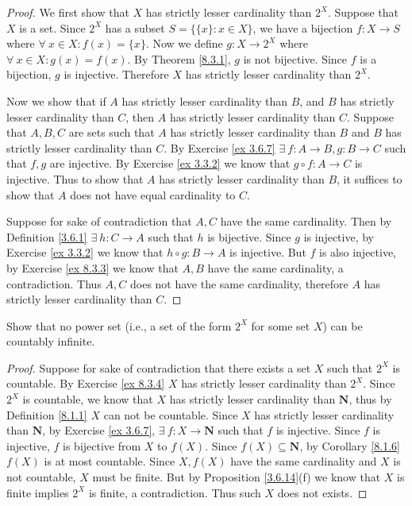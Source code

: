 \begin{proof}
    We first show that \(X\) has strictly lesser cardinality than \(2^X\).
    Suppose that \(X\) is a set.
    Since \(2^X\) has a subset \(S = \{\{x\} : x \in X\}\), we have a bijection \(f : X \to S\) where \(\forall\ x \in X : f(x) = \{x\}\).
    Now we define \(g : X \to 2^X\) where \(\forall\ x \in X : g(x) = f(x)\).
    By Theorem \ref{8.3.1}, \(g\) is not bijective.
    Since \(f\) is a bijection, \(g\) is injective.
    Therefore \(X\) has strictly lesser cardinality than \(2^X\).

    Now we show that if \(A\) has strictly lesser cardinality than \(B\), and \(B\) has strictly lesser cardinality than \(C\), then \(A\) has strictly lesser cardinality than \(C\).
    Suppose that \(A, B, C\) are sets such that \(A\) has strictly lesser cardinality than \(B\) and \(B\) has strictly lesser cardinality than \(C\).
    By Exercise \ref{ex 3.6.7} \(\exists\ f : A \to B, g : B \to C\) such that \(f, g\) are injective.
    By Exercise \ref{ex 3.3.2} we know that \(g \circ f : A \to C\) is injective.
    Thus to show that \(A\) has strictly lesser cardinality than \(B\), it suffices to show that \(A\) does not have equal cardinality to \(C\).

    Suppose for sake of contradiction that \(A, C\) have the same cardinality.
    Then by Definition \ref{3.6.1} \(\exists\ h : C \to A\) such that \(h\) is bijective.
    Since \(g\) is injective, by Exercise \ref{ex 3.3.2} we know that \(h \circ g : B \to A\) is injective.
    But \(f\) is also injective, by Exercise \ref{ex 8.3.3} we know that \(A, B\) have the same cardinality, a contradiction.
    Thus \(A, C\) does not have the same cardinality, therefore \(A\) has strictly lesser cardinality than \(C\).
\end{proof}

\begin{exercise}\label{ex 8.3.5}
    Show that no power set (i.e., a set of the form \(2^X\) for some set \(X\)) can be countably infinite.
\end{exercise}

\begin{proof}
    Suppose for sake of contradiction that there exists a set \(X\) such that \(2^X\) is countable.
    By Exercise \ref{ex 8.3.4} \(X\) has strictly lesser cardinality than \(2^X\).
    Since \(2^X\) is countable, we know that \(X\) has strictly lesser cardinality than \(\mathbf{N}\), thus by Definition \ref{8.1.1} \(X\) can not be countable.
    Since \(X\) has strictly lesser cardinality than \(\mathbf{N}\), by Exercise \ref{ex 3.6.7}, \(\exists\ f : X \to \mathbf{N}\) such that \(f\) is injective.
    Since \(f\) is injective, \(f\) is bijective from \(X\) to \(f(X)\).
    Since \(f(X) \subseteq \mathbf{N}\), by Corollary \ref{8.1.6} \(f(X)\) is at most countable.
    Since \(X, f(X)\) have the same cardinality and \(X\) is not countable, \(X\) must be finite.
    But by Proposition \ref{3.6.14}(f) we know that \(X\) is finite implies \(2^X\) is finite, a contradiction.
    Thus such \(X\) does not exists.
\end{proof}
